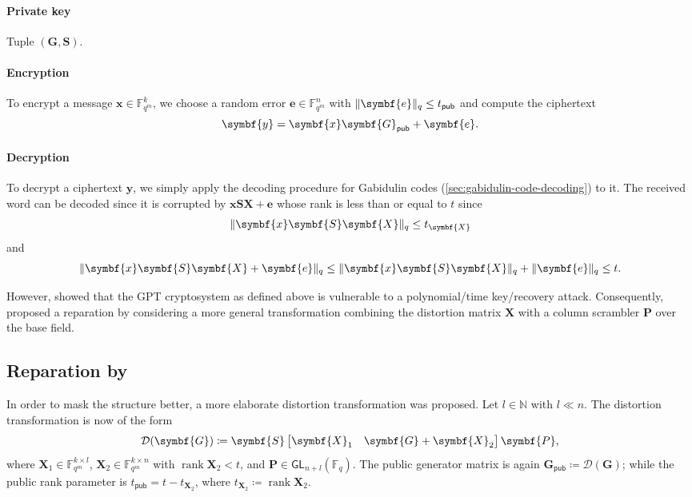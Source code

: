 \documentclass[version=last, paper=A4, parskip=half, oneside,%
toc=bibliography, toc=listof, listof=leveldown]{scrbook}
\theoremstyle{plain}
\theoremstyle{definition}
\theoremstyle{remark}
\renewcommand*{\vec}{\symbf}
\newcommand*{\mat}{\symbf}
\DeclareMathOperator{\rank}{rank}
\newcommand*{\GL}{\ensuremath{\mathsf{GL}}}
\newcommand*{\pub}{\ensuremath{\mathsf{pub}}}
\newcommand*{\FF}{\ensuremath{\mathbb{F}}}
\newcommand*{\NN}{\ensuremath{\mathbb{N}}}
\DeclarePairedDelimiter{\norm}{\lVert}{\rVert}
\newcommand*{\normR}[2]{\ensuremath{\norm{#1}_{#2}}}
\begin{document}
\paragraph{Private key} Tuple \((\mat{G}, \mat{S})\).

\paragraph{Encryption} To encrypt a message \(\vec{x} \in \FF_{q^m}^k\), we
choose a random error \(\vec{e} \in \FF_{q^m}^n\) with
\(\normR{\vec{e}}{q} \le t_{\pub}\) and compute the ciphertext
\[
  \vec{y} = \vec{x} \mat{G}_{\pub} + \vec{e}\text.
\]

\paragraph{Decryption} To decrypt a ciphertext \(\vec{y}\), we simply apply the
decoding procedure for Gabidulin codes (\cref{sec:gabidulin-code-decoding}) to
it.  The received word can be decoded since it is corrupted by
\(\vec{x} \mat{S} \mat{X} + \vec{e}\) whose rank is less than or equal to \(t\)
since
\[
  \normR{\vec{x} \mat{S} \mat{X}}{q} \le t_{\mat{X}}
\]
and
\[
  \normR{\vec{x} \mat{S} \mat{X} + \vec{e}}{q} \le
  \normR{\vec{x} \mat{S} \mat{X}}{q} + \normR{\vec{e}}{q} \le
  t\text.
\]

However, \textcites{Gib95, Gib96} showed that the GPT cryptosystem as defined
above is vulnerable to a polynomial\-/time key\-/recovery attack.  Consequently,
\textcite{GO01} proposed a reparation by considering a more general
transformation combining the distortion matrix \(\mat{X}\) with a column
scrambler \(\mat{P}\) over the base field.

\subsection{Reparation by \texorpdfstring{\textcite{GO01}}{Gabidulin and
    Ourivski}}

In order to mask the structure better, a more elaborate distortion
transformation was proposed.  Let \(l \in \NN\) with \(l \ll n\).  The
distortion transformation is now of the form
\begin{equation}\label{eq:distortion-transformation}
  \mathcal{D}(\mat{G}) \coloneqq
  \mat{S}
  \begin{bmatrix} \mat{X}_1 & \mat{G} + \mat{X}_2 \end{bmatrix}
  \mat{P}\text,
\end{equation}
where \(\mat{X}_1 \in \FF_{q^m}^{k \times l}\),
\(\mat{X}_2 \in \FF_{q^m}^{k \times n}\) with \(\rank \mat{X}_2 < t\), and
\(\mat{P} \in \GL_{n + l}(\FF_q)\).  The public generator matrix is again
\(\mat{G}_{\pub} \coloneqq \mathcal{D}(\mat{G})\); while the public rank
parameter is \(t_{\pub} = t - t_{\mat{X}_2}\), where
\(t_{\mat{X}_2} \coloneqq \rank \mat{X}_2\).
\end{document}
